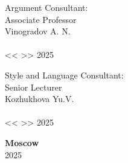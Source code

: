 \documentclass[%
]{article}
\begin{document}
\begin{titlepage}
   \begin{flushright}
    Argument Consultant: \\
    Associate Professor \\
    Vinogradov A. N. \\
    \underline{\phantom{signature signature}} \\
    << \underline{\phantom{day}} >> \underline{\phantom{month month}} 2025
   \end{flushright}

   \vspace*{\fill}

   \begin{flushright}
    Style and Language Consultant: \\
    Senior Lecturer \\
    Kozhukhova Yu.V. \\
    \underline{\phantom{signature signature}} \\
    << \underline{\phantom{day}} >> \underline{\phantom{month month}} 2025
   \end{flushright}


   \begin{center} \textbf{Moscow} \\ 2025 \end{center}
  \thispagestyle{empty} %
   
  \end{titlepage}
  
  \newpage






\end{document}
